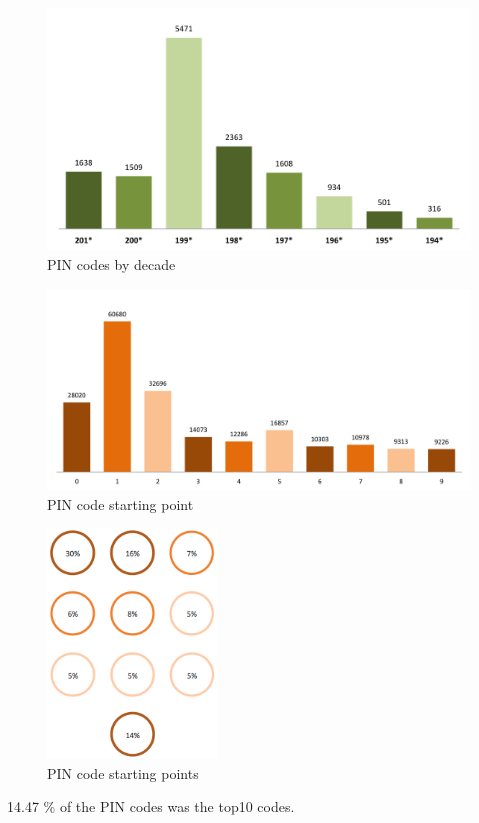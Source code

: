   \begin{figure}[H]
    \centering
    \includegraphics[width=\textwidth]{pics/analysis/pindecades.png}
    \caption{PIN codes by decade}
    \label{fig:pindecades}
  \end{figure}

  \begin{figure}[H]
    \centering
    \includegraphics[width=\textwidth]{pics/analysis/pinstart.png}
    \caption{PIN code starting point}
    \label{fig:pinstart}
  \end{figure}

  \begin{figure}[H]
    \centering
    \includegraphics[width=0.40\textwidth]{pics/analysis/startpointpin.png}
    \caption{PIN code starting points}
    \label{fig:pinstart2}
  \end{figure}

  14.47 \% of the PIN codes was the top10 codes.






